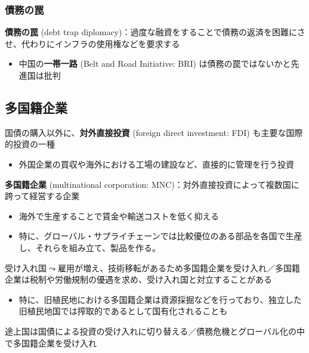 \documentclass[
  xelatex,
  ja=standard]{bxjsarticle}
\providecommand{\tightlist}{%
  \setlength{\itemsep}{0pt}\setlength{\parskip}{0pt}}\usepackage{longtable,booktabs,array}
\begin{document}
\hypertarget{ux50b5ux52d9ux306eux7f60}{%
\subsubsection{債務の罠}\label{ux50b5ux52d9ux306eux7f60}}

\textbf{債務の罠} (debt trap
diplomacy)：過度な融資をすることで債務の返済を困難にさせ、代わりにインフラの使用権などを要求する

\begin{itemize}
\tightlist
\item
  中国の\textbf{一帯一路} (Belt and Road Initiative: BRI)
  は債務の罠ではないかと先進国は批判
\end{itemize}

\hypertarget{ux591aux56fdux7c4dux4f01ux696d}{%
\subsection{多国籍企業}\label{ux591aux56fdux7c4dux4f01ux696d}}

国債の購入以外に、\textbf{対外直接投資} (foreign direct investment: FDI)
も主要な国際的投資の一種

\begin{itemize}
\tightlist
\item
  外国企業の買収や海外における工場の建設など、直接的に管理を行う投資
\end{itemize}

\textbf{多国籍企業} (multinational corporation:
MNC)：対外直接投資によって複数国に跨って経営する企業

\begin{itemize}
\tightlist
\item
  海外で生産することで賃金や輸送コストを低く抑える
\item
  特に、グローバル・サプライチェーンでは比較優位のある部品を各国で生産し、それらを組み立て、製品を作る。
\end{itemize}

受け入れ国\(\leadsto\)雇用が増え、技術移転があるため多国籍企業を受け入れ／多国籍企業は税制や労働規制の優遇を求め、受け入れ国と対立することがある

\begin{itemize}
\tightlist
\item
  特に、旧植民地における多国籍企業は資源採掘などを行っており、独立した旧植民地国では搾取的であるとして国有化されることも
\end{itemize}

途上国は国債による投資の受け入れに切り替える／債務危機とグローバル化の中で多国籍企業を受け入れ
\end{document}
